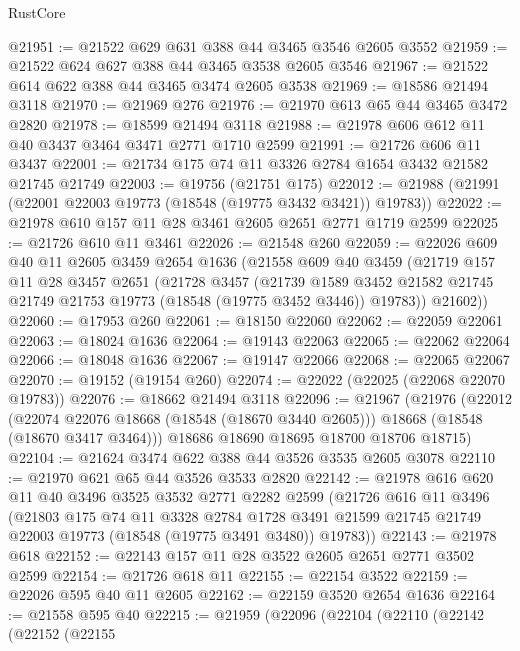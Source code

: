 \begin{lexlean}{RustCore}
\begin{coremodule}
@21951 := @21522 @629 @631 @388 @44 @3465 @3546 @2605 @3552
@21959 := @21522 @624 @627 @388 @44 @3465 @3538 @2605 @3546
@21967 := @21522 @614 @622 @388 @44 @3465 @3474 @2605 @3538
@21969 := @18586 @21494 @3118
@21970 := @21969 @276
@21976 := @21970 @613 @65 @44 @3465 @3472 @2820
@21978 := @18599 @21494 @3118
@21988 := @21978 @606 @612 @11 @40 @3437 @3464 @3471 @2771 @1710 @2599
@21991 := @21726 @606 @11 @3437
@22001 := @21734 @175 @74 @11 @3326 @2784 @1654 @3432 @21582 @21745 @21749
@22003 := @19756 (@21751 @175)
@22012 := @21988 (@21991 (@22001 @22003 @19773 (@18548 (@19775 @3432 @3421)) @19783))
@22022 := @21978 @610 @157 @11 @28 @3461 @2605 @2651 @2771 @1719 @2599
@22025 := @21726 @610 @11 @3461
@22026 := @21548 @260
@22059 := @22026
    @609
    @40
    @11
    @2605
    @3459
    @2654
    @1636
    (@21558
      @609
      @40
      @3459
      (@21719
        @157
        @11
        @28
        @3457
        @2651
        (@21728
          @3457
          (@21739
            @1589
            @3452
            @21582
            @21745
            @21749
            @21753
            @19773
            (@18548 (@19775 @3452 @3446))
            @19783))
        @21602))
@22060 := @17953 @260
@22061 := @18150 @22060
@22062 := @22059 @22061
@22063 := @18024 @1636
@22064 := @19143 @22063
@22065 := @22062 @22064
@22066 := @18048 @1636
@22067 := @19147 @22066
@22068 := @22065 @22067
@22070 := @19152 (@19154 @260)
@22074 := @22022 (@22025 (@22068 @22070 @19783))
@22076 := @18662 @21494 @3118
@22096 := @21967
    (@21976
      (@22012
        (@22074 @22076 @18668 (@18548 (@18670 @3440 @2605)))
        @18668
        (@18548 (@18670 @3417 @3464)))
      @18686
      @18690
      @18695
      @18700
      @18706
      @18715)
@22104 := @21624 @3474 @622 @388 @44 @3526 @3535 @2605 @3078
@22110 := @21970 @621 @65 @44 @3526 @3533 @2820
@22142 := @21978
    @616
    @620
    @11
    @40
    @3496
    @3525
    @3532
    @2771
    @2282
    @2599
    (@21726
      @616
      @11
      @3496
      (@21803
        @175
        @74
        @11
        @3328
        @2784
        @1728
        @3491
        @21599
        @21745
        @21749
        @22003
        @19773
        (@18548 (@19775 @3491 @3480))
        @19783))
@22143 := @21978 @618
@22152 := @22143 @157 @11 @28 @3522 @2605 @2651 @2771 @3502 @2599
@22154 := @21726 @618 @11
@22155 := @22154 @3522
@22159 := @22026 @595 @40 @11 @2605
@22162 := @22159 @3520 @2654 @1636
@22164 := @21558 @595 @40
@22215 := @21959
    (@22096
      (@22104
        (@22110
          (@22142
            (@22152
              (@22155

\end{coremodule}
\end{lexlean}
